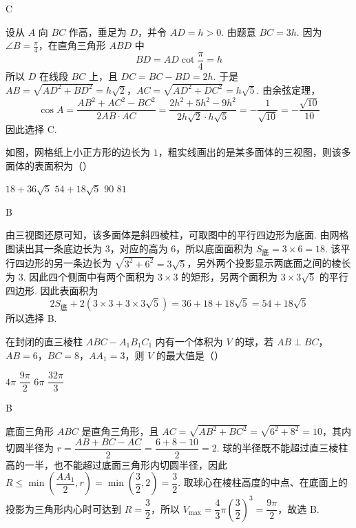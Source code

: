 \begin{answer}
C
\end{answer}

\begin{solution}
设从 \(A\) 向 \(BC\) 作高，垂足为 \(D\)，并令 \(AD=h>0\). 由题意 \(BC=3h\). 因为 \(\angle B=\frac\pi4\)，在直角三角形 \(ABD\) 中
\[
BD=AD\cot\frac\pi4=h
\]
所以 \(D\) 在线段 \(BC\) 上，且 \(DC=BC-BD=2h\). 于是
\(AB=\sqrt{AD^2+BD^2}=h\sqrt2\)，\(AC=\sqrt{AD^2+DC^2}=h\sqrt5\).
由余弦定理，
\[
\cos A=\frac{AB^2+AC^2-BC^2}{2AB\cdot AC}
=\frac{2h^2+5h^2-9h^2}{2h\sqrt2\cdot h\sqrt5}
=-\frac{1}{\sqrt{10}}=-\frac{\sqrt{10}}{10}
\]
因此选择 C.
\end{solution}

\begin{problem}
如图，网格纸上小正方形的边长为 \(1\)，粗实线画出的是某多面体的三视图，则该多面体的表面积为（\quad）

\begingroup
{}
\endgroup

\choices
    {\(18+36\sqrt5\)}
    {\(54+18\sqrt5\)}
    {\(90\)}
    {\(81\)}
\end{problem}

\begin{answer}
B
\end{answer}

\begin{solution}
由三视图还原可知，该多面体是斜四棱柱，可取图中的平行四边形为底面. 由网格图读出其一条底边长为 \(3\)，对应的高为 \(6\)，所以底面面积为 \(S_\text{底}=3\times6=18\).
该平行四边形的另一条边长为 \(\sqrt{3^2+6^2}=3\sqrt5\)，另外两个投影显示两底面之间的棱长为 \(3\). 因此四个侧面中有两个面积为 \(3\times3\) 的矩形，另两个面积为 \(3\times3\sqrt5\) 的平行四边形.
因此表面积为
\[
2S_\text{底}+2\left(3\times3+3\times3\sqrt5\right)=36+18+18\sqrt5=54+18\sqrt5
\]
所以选择 B.
\end{solution}

\begin{problem}
在封闭的直三棱柱 \(ABC-A_1B_1C_1\) 内有一个体积为 \(V\) 的球，若 \(AB\perp BC\)，\(AB=6\)，\(BC=8\)，\(AA_1=3\)，则 \(V\) 的最大值是（\quad）

\choices
    {\(4\pi\)}
    {\(\dfrac{9\pi}{2}\)}
    {\(6\pi\)}
    {\(\dfrac{32\pi}{3}\)}
\end{problem}

\begin{answer}
B
\end{answer}

\begin{solution}
底面三角形 \(ABC\) 是直角三角形，且 \(AC=\sqrt{AB^2+BC^2}=\sqrt{6^2+8^2}=10\)，其内切圆半径为 \(r=\dfrac{AB+BC-AC}{2}=\dfrac{6+8-10}{2}=2\). 球的半径既不能超过直三棱柱高的一半，也不能超过底面三角形内切圆半径，因此 \(R\le\min\left(\dfrac{AA_1}{2},r\right)=\min\left(\dfrac32,2\right)=\dfrac32\). 取球心在棱柱高度的中点、在底面上的投影为三角形内心时可达到 \(R=\dfrac32\)，所以 \(V_{\max}=\dfrac43\pi\left(\dfrac32\right)^3=\dfrac{9\pi}{2}\)，故选 B.
\end{solution}

